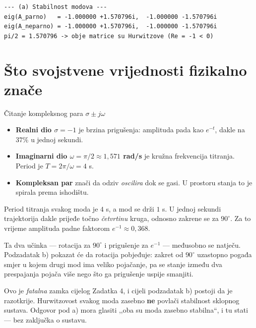 \begin{lstlisting}[style=outputstyle]
--- (a) Stabilnost modova ---
eig(A_parno)   = -1.000000 +1.570796i,  -1.000000 -1.570796i
eig(A_neparno) = -1.000000 +1.570796i,  -1.000000 -1.570796i
pi/2 = 1.570796 -> obje matrice su Hurwitzove (Re = -1 < 0)
\end{lstlisting}

\section{Što svojstvene vrijednosti fizikalno znače}
\label{sec:z4-fizikalno}

\begin{pojam}{Čitanje kompleksnog para $\sigma \pm j\omega$}
\begin{itemize}[leftmargin=*]
  \item \textbf{Realni dio $\sigma = -1$} je brzina prigušenja: amplituda pada
        kao $e^{-t}$, dakle na $37\%$ u jednoj sekundi.
  \item \textbf{Imaginarni dio $\omega = \pi/2 \approx 1{,}571$ rad/s} je kružna
        frekvencija titranja. Period je $T = 2\pi/\omega = 4$ s.
  \item \textbf{Kompleksan par} znači da odziv \emph{oscilira} dok se gasi. U
        prostoru stanja to je spirala prema ishodištu.
\end{itemize}
\end{pojam}

\begin{korak}[Zašto je $\omega = \pi/2$ ovdje presudan]
Period titranja svakog moda je $4$ s, a mod se drži $1$ s. U jednoj sekundi
trajektorija dakle prijeđe točno \emph{četvrtinu} kruga, odnosno zakrene se za
$90^\circ$. Za to vrijeme amplituda padne faktorom $e^{-1} \approx 0{,}368$.

Ta dva učinka --- rotacija za $90^\circ$ i prigušenje za $e^{-1}$ --- međusobno se
natječu. Podzadatak b) pokazat će da rotacija pobjeđuje: zakret od $90^\circ$
uzastopno pogađa smjer u kojem drugi mod ima veliko pojačanje, pa se stanje
između dva prespajanja pojača više nego što ga prigušenje uspije smanjiti.
\end{korak}

\begin{zamka}
Ovo je \emph{fatalna} zamka cijelog Zadatka 4, i cijeli podzadatak b) postoji da
je razotkrije. Hurwitzovost svakog moda zasebno \textbf{ne} povlači stabilnost
sklopnog sustava. Odgovor pod a) mora glasiti ,,oba su moda zasebno stabilna``,
i tu stati --- bez zaključka o sustavu.
\end{zamka}

